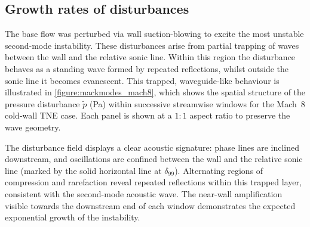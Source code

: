 

\subsection{Growth rates of disturbances}
The base flow was perturbed via wall suction-blowing to excite the most unstable second-mode instability. These disturbances arise from partial trapping of waves between the wall and the relative sonic line. Within this region the disturbance behaves as a standing wave formed by repeated reflections, whilst outside the sonic line it becomes evanescent. This trapped, waveguide-like behaviour is illustrated in \cref{figure:mackmodes_mach8}, which shows the spatial structure of the pressure disturbance $\tilde{p}$ (Pa) within successive streamwise windows for the Mach~8 cold-wall \gls{TNE} case. Each panel is shown at a $1{:}1$ aspect ratio to preserve the wave geometry. 

The disturbance field displays a clear acoustic signature: phase lines are inclined downstream, and oscillations are confined between the wall and the relative sonic line (marked by the solid horizontal line at $\delta_{99}$). Alternating regions of compression and rarefaction reveal repeated reflections within this trapped layer, consistent with the second-mode acoustic wave. The near-wall amplification visible towards the downstream end of each window demonstrates the expected exponential growth of the instability.

